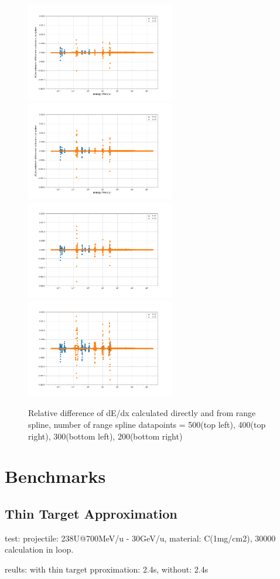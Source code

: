 \documentclass[12pt,a4paper]{article}
\begin{document}
\begin{figure}[h]
	\centering
    \includegraphics[width=6.5cm]{plots/dedx_difs_n500.png}
   	\includegraphics[width=6.5cm]{plots/dedx_difs_n400.png}
   	\includegraphics[width=6.5cm]{plots/dedx_difs_n300.png}
   	\includegraphics[width=6.5cm]{plots/dedx_difs_n200.png}
	\caption{Relative difference of dE/dx calculated directly and from range spline, number of range spline datapoints = 500(top left), 400(top right), 300(bottom left), 200(bottom right)}
\end{figure}	



\section{Benchmarks}
\subsection{Thin Target Approximation}
test: projectile: 238U@700MeV/u - 30GeV/u, material: C(1mg/cm2), 30000 calculation in loop.

reults: with thin target pproximation: 2.4s, without: 2.4s
	
\end{document}

